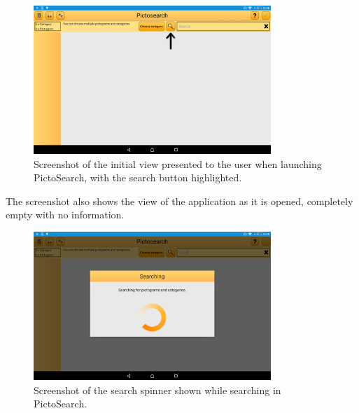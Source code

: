 \begin{figure}[h]
    \centering
    \includegraphics[width=0.8\textwidth]{figures/img/screenshots/old_startup.png}
    \caption{Screenshot of the initial view presented to the user when launching PictoSearch, with the search button highlighted.}\label{fig:screenshot_startup}
\end{figure}
The screenshot also shows the view of the application as it is opened, completely empty with no information.

\begin{figure}[h]
    \centering
    \includegraphics[width=0.8\textwidth]{figures/img/screenshots/old_dialog.png}
    \caption{Screenshot of the search spinner shown while searching in PictoSearch.}\label{fig:screenshot_searchspinner}
\end{figure}

